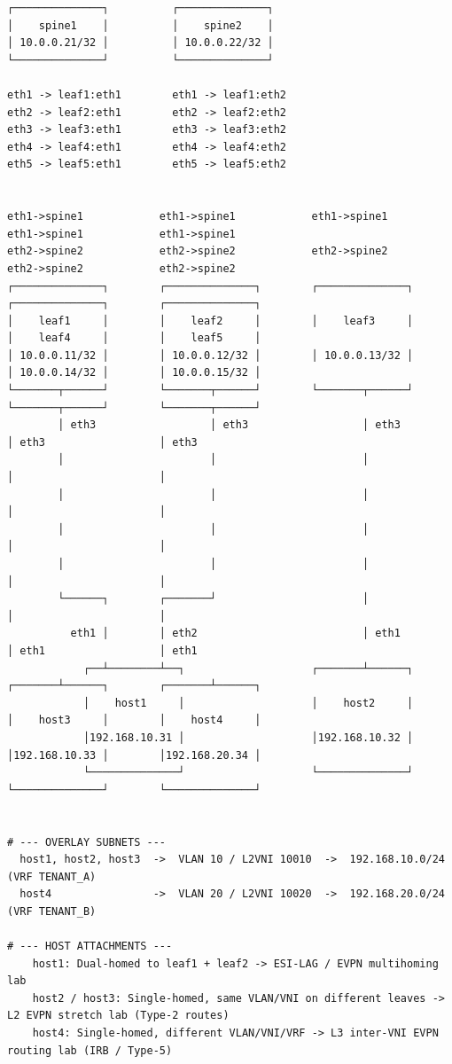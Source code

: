 \documentclass[11pt]{article}
\begin{document}
\begin{verbatim}
┌──────────────┐          ┌──────────────┐
│    spine1    │          │    spine2    │
│ 10.0.0.21/32 │          │ 10.0.0.22/32 │
└──────────────┘          └──────────────┘

eth1 -> leaf1:eth1        eth1 -> leaf1:eth2
eth2 -> leaf2:eth1        eth2 -> leaf2:eth2
eth3 -> leaf3:eth1        eth3 -> leaf3:eth2
eth4 -> leaf4:eth1        eth4 -> leaf4:eth2
eth5 -> leaf5:eth1        eth5 -> leaf5:eth2


eth1->spine1            eth1->spine1            eth1->spine1            eth1->spine1            eth1->spine1
eth2->spine2            eth2->spine2            eth2->spine2            eth2->spine2            eth2->spine2
┌──────────────┐        ┌──────────────┐        ┌──────────────┐        ┌──────────────┐        ┌──────────────┐
│    leaf1     │        │    leaf2     │        │    leaf3     │        │    leaf4     │        │    leaf5     │
│ 10.0.0.11/32 │        │ 10.0.0.12/32 │        │ 10.0.0.13/32 │        │ 10.0.0.14/32 │        │ 10.0.0.15/32 │
└───────┬──────┘        └───────┬──────┘        └───────┬──────┘        └───────┬──────┘        └───────┬──────┘
        │ eth3                  │ eth3                  │ eth3                  │ eth3                  │ eth3
        │                       │                       │                       │                       │
        │                       │                       │                       │                       │
        │                       │                       │                       │                       │
        │                       │                       │                       │                       │
        └──────┐        ┌───────┘                       │                       │                       │
          eth1 │        │ eth2                          │ eth1                  │ eth1                  │ eth1
            ┌──┴────────┴──┐                    ┌───────┴──────┐        ┌───────┴──────┐        ┌───────┴──────┐
            │    host1     │                    │    host2     │        │    host3     │        │    host4     │
            │192.168.10.31 │                    │192.168.10.32 │        │192.168.10.33 │        │192.168.20.34 │
            └──────────────┘                    └──────────────┘        └──────────────┘        └──────────────┘


# --- OVERLAY SUBNETS ---
  host1, host2, host3  ->  VLAN 10 / L2VNI 10010  ->  192.168.10.0/24  (VRF TENANT_A)
  host4                ->  VLAN 20 / L2VNI 10020  ->  192.168.20.0/24  (VRF TENANT_B)

# --- HOST ATTACHMENTS ---
    host1: Dual-homed to leaf1 + leaf2 -> ESI-LAG / EVPN multihoming lab
    host2 / host3: Single-homed, same VLAN/VNI on different leaves -> L2 EVPN stretch lab (Type-2 routes)
    host4: Single-homed, different VLAN/VNI/VRF -> L3 inter-VNI EVPN routing lab (IRB / Type-5)

\end{verbatim}
\end{document}

